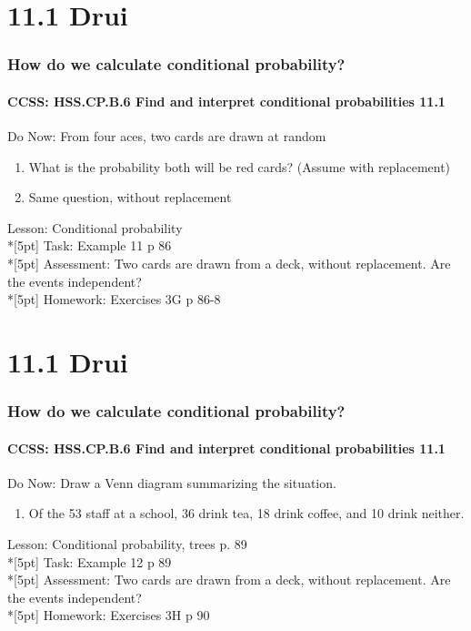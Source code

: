 \documentclass{beamer}
\begin{document}
  \section{11.1 Drui}
  \frame
  {
    \frametitle{How do we calculate conditional probability?}
    \framesubtitle{CCSS: HSS.CP.B.6 Find and interpret conditional probabilities \qquad \alert{11.1}}

    \begin{block}{Do Now: From four aces, two cards are drawn at random}
    \begin{enumerate}
        \item What is the probability both will be red cards? (Assume with replacement)
        \item Same question, without replacement
    \end{enumerate}
    \end{block}
    Lesson: Conditional probability\\*[5pt]
    Task: Example 11 p 86\\*[5pt]
    Assessment: Two cards are drawn from a deck, without replacement. Are the events independent?\\*[5pt]
    Homework: Exercises 3G p 86-8
  }
  \section{11.1 Drui}
  \frame
  {
    \frametitle{How do we calculate conditional probability?}
    \framesubtitle{CCSS: HSS.CP.B.6 Find and interpret conditional probabilities \qquad \alert{11.1}}

    \begin{block}{Do Now: Draw a Venn diagram summarizing the situation.}
    \begin{enumerate}
        \item Of the 53 staff at a school, 36 drink tea, 18 drink coffee, and 10 drink neither.
    \end{enumerate}
    \end{block}
    Lesson: Conditional probability, trees p. 89\\*[5pt]
    Task: Example 12 p 89\\*[5pt]
    Assessment: Two cards are drawn from a deck, without replacement. Are the events independent?\\*[5pt]
    Homework: Exercises 3H p 90
  }
\end{document}
